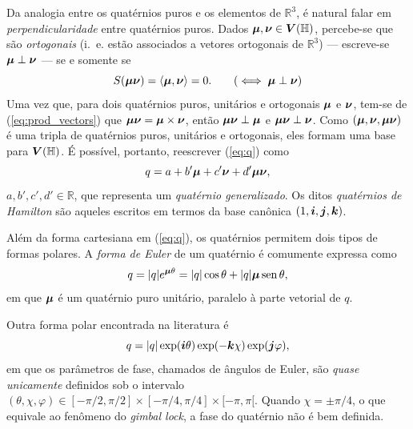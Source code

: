 Da analogia entre os quat\'ernios puros e os elementos de $ \mathbb{R}^3 $, \'e natural falar em \emph{perpendicularidade} entre quat\'ernios puros. Dados $ \boldsymbol{\mu},  \boldsymbol{\nu} \in \boldsymbol{V}(\mathbb{H})$, percebe-se que s\~ao \emph{ortogonais} (i.~e. est\~ao associados a vetores ortogonais de $ \mathbb{R}^3 $) --- escreve-se $ \boldsymbol{\mu} \perp \boldsymbol{\nu} $ --- se e somente se
\begin{equation}
S(\qmu \qnu) = \langle \qmu, \qnu \rangle = 0.
\tag{$ \iff \qmu \perp \qnu $}
\end{equation}
Uma vez que, para dois quat\'ernios puros, unit\'arios e ortogonais $ \boldsymbol{\mu} $ e $ \boldsymbol{\nu} $, tem-se de (\ref{eq:prod_vectors}) que $ \boldsymbol{\mu} \boldsymbol{\nu}  = \boldsymbol{\mu} \times \boldsymbol{\nu}$, ent\~ao $ \boldsymbol{\mu} \boldsymbol{\nu} \perp \boldsymbol{\mu} $ e $ \boldsymbol{\mu} \boldsymbol{\nu} \perp \boldsymbol{\nu} $. Como $ (\boldsymbol{\mu}, \boldsymbol{\nu}, \boldsymbol{\mu} \boldsymbol{\nu}) $ \'e uma tripla de quat\'ernios puros, unit\'arios e ortogonais, eles formam uma base para $ \boldsymbol{V} (\mathbb{H}) $. \'E poss\'ivel, portanto, reescrever (\ref{eq:q}) como
\begin{equation}
\label{eq:quat_generalizado}
q = a + b'\boldsymbol{\mu} + c'\boldsymbol{\nu} + d'\boldsymbol{\mu} \boldsymbol{\nu},
\end{equation}
$a, b', c', d' \in \mathbb{R}$,
que representa um \emph{quat\'ernio generalizado}. Os ditos \emph{quat\'ernios de Hamilton} s\~ao aqueles escritos em termos da base can\^onica $ (1, \boldsymbol{i}, \boldsymbol{j}, \boldsymbol{k}) $.


Al\'em da forma cartesiana em (\ref{eq:q}), os quat\'ernios permitem dois tipos de formas polares. A \emph{forma de Euler} \cite{ell2014quaternion} de um quat\'ernio \'e comumente expressa como
\begin{equation}
\label{eq:euler}
q = |q| e^{\boldsymbol{\mu} \theta} = |q|\cos \theta + |q|\boldsymbol{\mu} \mathrm{\, sen \,} \theta,
\end{equation}
em que $ \boldsymbol{\mu} $ \'e um quat\'ernio puro unit\'ario, paralelo \`a parte vetorial de $ q $.

Outra forma polar encontrada na literatura \cite{flamant2017time} \'e
\begin{equation}
q = |q| \exp (\boldsymbol{i} \theta) \exp (-\boldsymbol{k} \chi) \exp (\boldsymbol{j} \varphi),
\end{equation}
em que os par\^ametros de fase, chamados de \^angulos de Euler, s\~ao \emph{quase unicamente} definidos sob o intervalo $ (\theta, \chi, \varphi) \in [-\pi/2, \pi/2] \times [-\pi/4, \pi/4] \times [-\pi, \pi[ $. Quando $ \chi = \pm \pi/4 $, o que equivale ao fen\^omeno do \emph{gimbal lock}, a fase do quat\'ernio n\~ao \'e bem definida.

